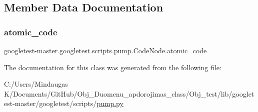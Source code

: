 \subsection{Member Data Documentation}
\mbox{\label{classgoogletest-master_1_1googletest_1_1scripts_1_1pump_1_1_code_node_a24aa96557627dd9dee828e0fa31f5a1e}} 
\subsubsection{\texorpdfstring{atomic\_code}{atomic\_code}}
{\footnotesize\ttfamily googletest-\/master.\+googletest.\+scripts.\+pump.\+Code\+Node.\+atomic\+\_\+code}



The documentation for this class was generated from the following file\+:\begin{DoxyCompactItemize}
\item 
C\+:/\+Users/\+Mindaugas K/\+Documents/\+Git\+Hub/\+Obj\+\_\+\+Duomenu\+\_\+apdorojimas\+\_\+class/\+Obj\+\_\+test/lib/googletest-\/master/googletest/scripts/\mbox{\hyperlink{_obj__test_2lib_2googletest-master_2googletest_2scripts_2pump_8py}{pump.\+py}}\end{DoxyCompactItemize}
